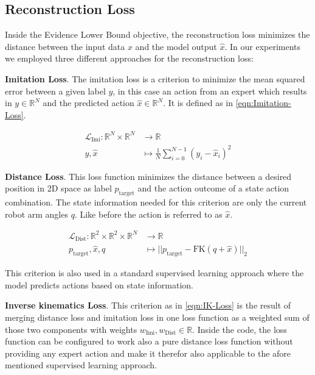\subsection{Reconstruction Loss}

Inside the Evidence Lower Bound objective, the reconstruction loss minimizes the distance between the input data $x$ and the model output $\hat{x}$. In our experiments we employed three different approaches for the reconstruction loss:


\textbf{Imitation Loss}. The imitation loss is a criterion to minimize the mean squared error between a given label $y$, in this case an action from an expert which results in $y \in \mathbb{R}^N$ and the predicted action $\hat{x} \in \mathbb{R}^N$. It is defined as in \eqref{eqn:Imitation-Loss}.

\begin{equation}\label{eqn:Imitation-Loss}
    \begin{split}
        \mathcal{L}_\text{Imi}: \mathbb{R}^N \times \mathbb{R}^N & \to \mathbb{R} \\
        y, \hat{x} & \mapsto \frac{1}{N}\sum_{i = 0}^{N-1} (y_i - \hat{x}_i)^2 
    \end{split}
\end{equation}


\textbf{Distance Loss}. This loss function minimizes the distance between a desired position in 2D space as label $p_\text{target}$ and the action outcome of a state action combination. The state information needed for this criterion are only the current robot arm angles $q$. Like before the action is referred to as $\hat{x}$. 

\begin{equation}\label{eqn:Distance-Loss}
    \begin{split}
        \mathcal{L}_\text{Dist}: \mathbb{R}^2 \times \mathbb{R}^2 \times \mathbb{R}^N & \to \mathbb{R} \\
        p_\text{target}, \hat{x}, q & \mapsto ||p_\text{target} - \text{FK}(q + \hat{x})||_2
    \end{split}
\end{equation}

This criterion is also used in a standard supervised learning approach where the model predicts actions based on state information.

\textbf{Inverse kinematics Loss}. This criterion as in \eqref{eqn:IK-Loss} is the result of merging distance loss and imitation loss in one loss function as a weighted sum of those two components with weights $w_\text{Imi}, w_\text{Dist} \in \mathbb{R}$. Inside the code, the loss function can be configured to work also a pure distance loss function without providing any expert action and make it therefor also applicable to the afore mentioned supervised learning approach. 

